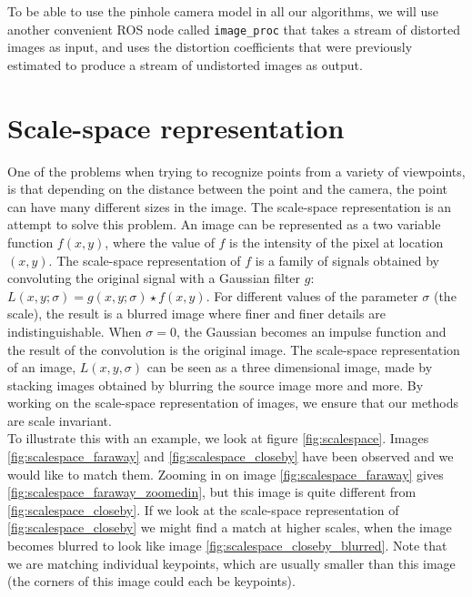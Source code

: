 To be able to use the pinhole camera model in all our algorithms, we will use another convenient ROS node called \texttt{image\_proc} that takes a stream of distorted images as input, and uses the distortion coefficients that were previously estimated to produce a stream of undistorted images as output.

\section{Scale-space representation}
One of the problems when trying to recognize points from a variety of viewpoints, is that depending on the distance between the point and the camera, the point can have many different sizes in the image. The scale-space representation is an attempt to solve this problem. An image can be represented as a two variable function $f(x,y)$, where the value of $f$ is the intensity of the pixel at location $(x,y)$. The scale-space representation of $f$ is a family of signals obtained by convoluting the original signal with a Gaussian filter $g$: $L(x,y;\sigma) = g(x,y;\sigma) \star f(x,y)$. For different values of the parameter $\sigma$ (the scale), the result is a blurred image where finer and finer details are indistinguishable. When $\sigma=0$, the Gaussian becomes an impulse function and the result of the convolution is the original image. The scale-space representation of an image, $L(x,y,\sigma)$ can be seen as a three dimensional image, made by stacking images obtained by blurring the source image more and more. By working on the scale-space representation of images, we ensure that our methods are scale invariant. \cite{scalespace}\\

To illustrate this with an example, we look at figure \ref{fig:scalespace}. Images \ref{fig:scalespace_faraway} and \ref{fig:scalespace_closeby} have been observed and we would like to match them. Zooming in on image \ref{fig:scalespace_faraway} gives \ref{fig:scalespace_faraway_zoomedin}, but this image is quite different from \ref{fig:scalespace_closeby}. If we look at the scale-space representation of \ref{fig:scalespace_closeby} we might find a match at higher scales, when the image becomes blurred to look like image \ref{fig:scalespace_closeby_blurred}. Note that we are matching individual keypoints, which are usually smaller than this image (the corners of this image could each be keypoints).

